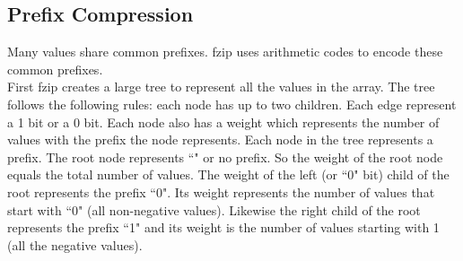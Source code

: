 \subsection{Prefix Compression}
Many values share common prefixes. fzip uses arithmetic codes to encode these common prefixes.\\
\indent First fzip creates a large tree to represent all the values in the array. The tree follows the following rules: each node has up to two children. Each edge represent a 1 bit or a 0 bit. Each node also has a weight which represents the number of values with the prefix the node represents. Each node in the tree represents a prefix. The root node represents ``" or no prefix. So the weight of the root node equals the total number of values. The weight of the left (or ``0" bit) child of the root represents the prefix ``0". Its weight represents the number of  values that start with ``0" (all non-negative values). Likewise the right child of the root represents the prefix ``1" and its weight is the number of values starting with 1 (all the negative values).\\
